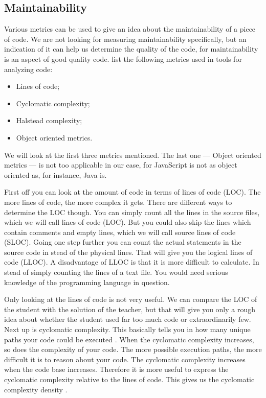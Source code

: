 \documentclass{article}
\begin{document}
\subsection{Maintainability}

Various metrics can be used to give an idea about the maintainability of a
piece of code. We are not looking for measuring maintainability specifically,
but an indication of it can help us determine the quality of the code, for
maintainability is an aspect of good quality code. \citet{rakic2013problems}
list the following metrics used in tools for analyzing code:
\begin{itemize}
  \item Lines of code;
  \item Cyclomatic complexity;
  \item Halstead complexity;
  \item Object oriented metrics.
\end{itemize}
We will look at the first three metrics mentioned. The last one --- Object
oriented metrics --- is not too applicable in our case, for JavaScript is not
as object oriented as, for instance, Java is.

First off you can look at the amount of code in terms of lines of code
(LOC). The more lines of code, the more complex it gets. There are different
ways to determine the LOC though. You can simply count all the lines in the
source files, which we will call lines of code (LOC). But you could also skip
the lines which contain comments and empty lines, which we will call source
lines of code (SLOC). Going one step further you can count the actual
statements in the source code in stead of the physical lines. That will give
you the logical lines of code (LLOC). A disadvantage of LLOC is that it is more
difficult to calculate. In stead of simply counting the lines of a text
file. You would need serious knowledge of the programming language in question.

Only looking at the lines of code is not very useful. We can compare the LOC of
the student with the solution of the teacher, but that will give you only a
rough idea about whether the student used far too much code or extraordinarily
few. Next up is cyclomatic complexity. This basically tells you in how many
unique paths your code could be executed \citep{website:js-complexity}. When
the cyclomatic complexity increases, so does the complexity of your code. The
more possible execution paths, the more difficult it is to reason about your
code. The cyclomatic complexity increases when the code base
increases. Therefore it is more useful to express the cyclomatic complexity
relative to the lines of code. This gives us the cyclomatic complexity density
\citep{gill1991cyclomatic}.
\end{document}
